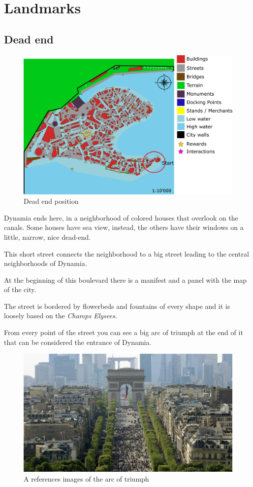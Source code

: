 \section{Landmarks}

\subsection{Dead end}
\begin{figure}[H]
  \centering
  \includegraphics[width=\textwidth]{Images/Maps/dynamia_deadEnd}
  \caption{Dead end position}
\end{figure}

Dynamia ends here, in a neighborhood of colored houses that overlook on the canals. Some houses have sea view, instead, the others have their windows on a little, narrow, nice dead-end.

This short street connects the neighborhood to a big street leading to the central neighborhoods of Dynamia.

At the beginning of this boulevard there is a manifest and a panel with the map of the city.

The street is bordered by flowerbeds and fountains of every shape and it is loosely based on the \textit{Champs Elysees}.

From every point of the street you can see a big arc of triumph at the end of it that can be considered the entrance of Dynamia.

\begin{figure}[H]
  \centering
  \includegraphics[width=\textwidth]{Images/Landmarks/arcOfTriumph}
  \caption{A references images of the arc of triumph}
\end{figure}

